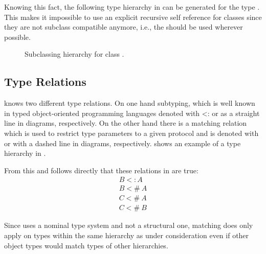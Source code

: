 Knowing this fact, the following type hierarchy in
 can be generated for the type \C. This makes
it impossible to use an explicit recursive self reference for classes
since they are not subclass compatible anymore, i.e., the \mytype should
be used wherever possible.

\begin{figure}[ht]
	\centering
	\caption{Subclassing hierarchy for class \C.}
	\label{fig:fixedHierarchy}
\end{figure}
%

\subsection{Type Relations}
\ooplss knows two different type relations. On one hand subtyping, which
is well known in typed object-oriented programming languages denoted with
<: or as a straight line in diagrams, respectively. On the other hand
there is a matching relation which is used to restrict type parameters
to a given protocol and is denoted with \match or with a dashed line in
diagrams, respectively.  shows an example of a type
hierarchy in \ooplss.

From this and  follows directly that these
relations in  are true:
\begin{align}
B <: A \\
B <\!\!\#~A \label{alg:match} \\
C <\!\!\#~A \\
C <\!\!\#~B
\end{align}

Since \ooplss uses a nominal type system and not a structural one,
matching does only apply on types within the same hierarchy as under
consideration even if other object types would match types of other
hierarchies.


